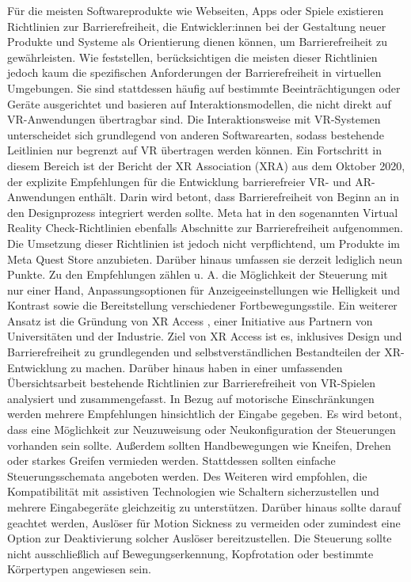Für die meisten Softwareprodukte wie Webseiten, Apps oder Spiele existieren Richtlinien zur Barrierefreiheit, die Entwickler:innen bei der Gestaltung neuer Produkte und Systeme als Orientierung dienen können, um Barrierefreiheit zu gewährleisten. Wie \citet{heilemann_accessibility_2021} feststellen, berücksichtigen die meisten dieser Richtlinien jedoch kaum die spezifischen Anforderungen der Barrierefreiheit in virtuellen Umgebungen. Sie sind stattdessen häufig auf bestimmte Beeinträchtigungen oder Geräte ausgerichtet und basieren auf Interaktionsmodellen, die nicht direkt auf VR-Anwendungen übertragbar sind. Die Interaktionsweise mit VR-Systemen unterscheidet sich grundlegend von anderen Softwarearten, sodass bestehende Leitlinien nur begrenzt auf VR übertragen werden können. Ein Fortschritt in diesem Bereich ist der Bericht der XR Association (XRA) aus dem Oktober 2020, der explizite Empfehlungen für die Entwicklung barrierefreier VR- und AR-Anwendungen enthält. Darin wird betont, dass Barrierefreiheit von Beginn an in den Designprozess integriert werden sollte. Meta hat in den sogenannten Virtual Reality Check-Richtlinien \citep{meta_meta_2024} ebenfalls Abschnitte zur Barrierefreiheit aufgenommen. Die Umsetzung dieser Richtlinien ist jedoch nicht verpflichtend, um Produkte im Meta Quest Store anzubieten. Darüber hinaus umfassen sie derzeit lediglich neun Punkte. Zu den Empfehlungen zählen u. A. die Möglichkeit der Steuerung mit nur einer Hand, Anpassungsoptionen für Anzeigeeinstellungen wie Helligkeit und Kontrast sowie die Bereitstellung verschiedener Fortbewegungsstile. Ein weiterer Ansatz ist die Gründung von XR Access \citep{xr_access_-_virtual_augmented__mixed_reality_for_people_with_disabilities_xr_2024}, einer Initiative aus Partnern von Universitäten und der Industrie. Ziel von XR Access ist es, inklusives Design und Barrierefreiheit zu grundlegenden und selbstverständlichen Bestandteilen der XR-Entwicklung zu machen. Darüber hinaus haben \citet{heilemann_accessibility_2021} in einer umfassenden Übersichtsarbeit bestehende Richtlinien zur Barrierefreiheit von VR-Spielen analysiert und zusammengefasst. In Bezug auf motorische Einschränkungen werden mehrere Empfehlungen hinsichtlich der Eingabe gegeben. Es wird betont, dass eine Möglichkeit zur Neuzuweisung oder Neukonfiguration der Steuerungen vorhanden sein sollte. Außerdem sollten Handbewegungen wie Kneifen, Drehen oder starkes Greifen vermieden werden. Stattdessen sollten einfache Steuerungsschemata angeboten werden. Des Weiteren wird empfohlen, die Kompatibilität mit assistiven Technologien wie Schaltern sicherzustellen und mehrere Eingabegeräte gleichzeitig zu unterstützen. Darüber hinaus sollte darauf geachtet werden, Auslöser für Motion Sickness zu vermeiden oder zumindest eine Option zur Deaktivierung solcher Auslöser bereitzustellen. Die Steuerung sollte nicht ausschließlich auf Bewegungserkennung, Kopfrotation oder bestimmte Körpertypen angewiesen sein.

